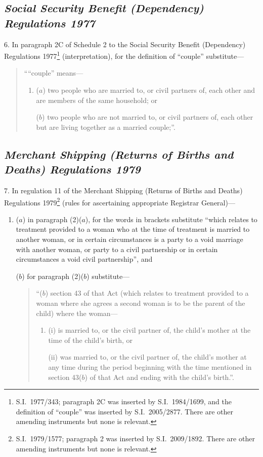 \documentclass[12pt,a4paper]{article}
\begin{document}
\subsection*{\itshape Social Security Benefit (Dependency) Regulations 1977}

6.  In paragraph 2C of Schedule 2 to the Social Security Benefit (Dependency) Regulations 1977\footnote{S.I.~1977/343; paragraph 2C was inserted by S.I.~1984/1699, and the definition of “couple” was inserted by S.I.~2005/2877. There are other amending instruments but none is relevant.} (interpretation), for the definition of “couple” substitute—
\begin{quotation}
““couple” means—
\begin{enumerate}\item[]
($a$) 
two people who are married to, or civil partners of, each other and are members of the same household; or

($b$) 
two people who are not married to, or civil partners of, each other but are living together as a married couple;”.
\end{enumerate}
\end{quotation}

\subsection*{\itshape Merchant Shipping (Returns of Births and Deaths) Regulations 1979}

7.  In regulation 11 of the Merchant Shipping (Returns of Births and Deaths) Regulations 1979\footnote{S.I.~1979/1577; paragraph 2 was inserted by S.I.~2009/1892. There are other amending instruments but none is relevant.} (rules for ascertaining appropriate Registrar General)—
\begin{enumerate}\item[]
($a$) in paragraph (2)($a$), for the words in brackets substitute “which relates to treatment provided to a woman who at the time of treatment is married to another woman, or in certain circumstances is a party to a void marriage with another woman, or party to a civil partnership or in certain circumstances a void civil partnership”, and

($b$) for paragraph (2)($b$)  substitute—
\begin{quotation}
“($b$) section 43 of that Act (which relates to treatment provided to a woman where she agrees a second woman is to be the parent of the child) where the woman—
\begin{enumerate}\item[]
(i) is married to, or the civil partner of, the child’s mother at the time of the child’s birth, or

(ii) was married to, or the civil partner of, the child’s mother at any time during the period beginning with the time mentioned in section 43($b$)  of that Act and ending with the child’s birth.”.
\end{enumerate}
\end{quotation}
\end{enumerate}
\end{document}
